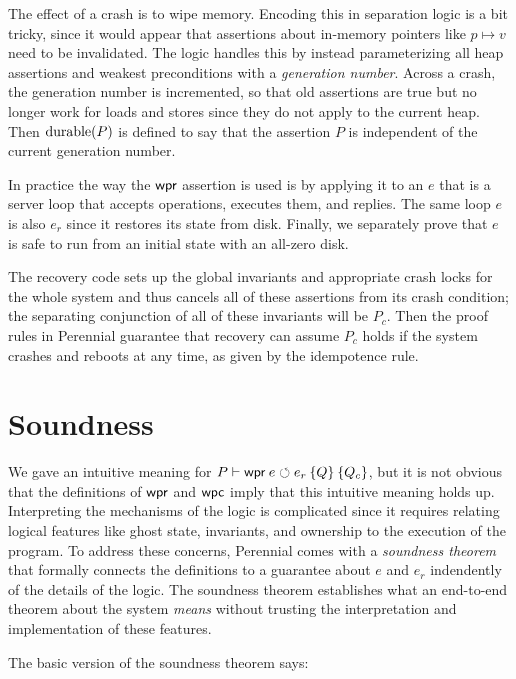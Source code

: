 The effect of a crash is to wipe memory. Encoding this in separation logic is a
bit tricky, since it would appear that assertions about in-memory pointers like
$p \mapsto v$ need to be invalidated. The logic handles this by instead
parameterizing all heap assertions and weakest preconditions with a
\emph{generation number}. Across a crash, the generation number is incremented,
so that old assertions are true but no longer work for loads and stores since
they do not apply to the current heap. Then $\operatorname{durable}(P)$ is defined to say that
the assertion $P$ is independent of the current generation number.

In practice the way the $\textsf{\upshape wpr}$ assertion is used is by applying it to an $e$
that is a server loop that accepts operations, executes them, and replies. The
same loop $e$ is also $e_{r}$ since it restores its state from disk. Finally, we
separately prove that $e$ is safe to run from an initial state with an all-zero
disk.

The recovery code sets up the global invariants and appropriate crash locks for
the whole system and thus cancels all of these assertions from its crash
condition; the separating conjunction of all of these invariants will be
$P_{c}$. Then the proof rules in Perennial guarantee that recovery can assume
$P_{c}$ holds if the system crashes and reboots at any time, as given by the
idempotence rule.

\section{Soundness}

We gave an intuitive meaning for $P \proves \wpr{e}{e_{r}}{Q}{Q_{c}}$, but it is
not obvious that the definitions of $\textsf{\upshape wpr}$ and $\textsf{\upshape wpc}$ imply that this
intuitive meaning holds up. Interpreting the mechanisms of the logic is
complicated since it requires relating logical features like ghost state,
invariants, and ownership to the execution of the program. To address these
concerns, Perennial comes with a \emph{soundness theorem} that formally connects
the definitions to a guarantee about $e$ and $e_{r}$ indendently of the details
of the logic. The soundness theorem establishes what an end-to-end theorem about
the system \emph{means} without trusting the interpretation and implementation
of these features.

The basic version of the soundness theorem says:

\newcommand{\bigast}{\mathop{\scalebox{3}{\raisebox{-0.3ex}{$\ast$}}}}

